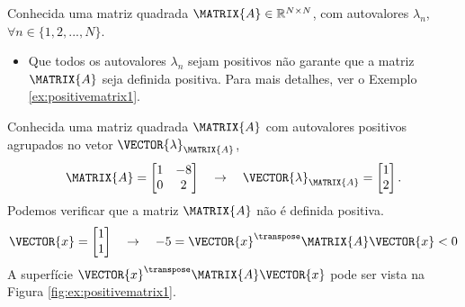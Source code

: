 \begin{tcbattention}
Conhecida uma matriz quadrada $\MATRIX{A} \in \mathbb{R}^{N \times N}$, 
com  autovalores $\lambda_n$, $\forall n \in \{1, 2, ..., N\}$.
\begin{itemize}
\item Que todos os autovalores $\lambda_n$ sejam positivos não garante que a matriz $\MATRIX{A}$
seja definida positiva. Para mais detalhes, ver o Exemplo \ref{ex:positivematrix1}.
\end{itemize}
\end{tcbattention}

\noindent
\begin{minipage}{0.5\textwidth}
\begin{example}
\label{ex:positivematrix1}
Conhecida uma matriz quadrada $\MATRIX{A}$ com autovalores positivos agrupados no vetor $\VECTOR{\lambda}_{\MATRIX{A}}$, 
\begin{equation}
\MATRIX{A}=
\begin{bmatrix}
1 & -8\\
0 & 2
\end{bmatrix}
\quad \rightarrow \quad 
\VECTOR{\lambda}_{\MATRIX{A}}=
\begin{bmatrix}
1 \\
2
\end{bmatrix}.
\end{equation}
Podemos verificar que a matriz $\MATRIX{A}$ não é definida positiva.
\begin{equation}
\VECTOR{x}=
\begin{bmatrix}
1 \\
1
\end{bmatrix}
\quad \rightarrow \quad 
-5 = \VECTOR{x}^{\transpose}\MATRIX{A}\VECTOR{x}<0
\end{equation}
A superfície $\VECTOR{x}^{\transpose}\MATRIX{A}\VECTOR{x}$ 
pode ser vista na Figura \ref{fig:ex:positivematrix1}.
\end{example}
\end{minipage}
